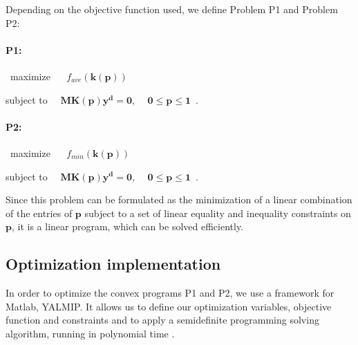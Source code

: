 
        \noindent Depending on the objective function used, we define Problem P1 and Problem P2:

        \paragraph{P1:} ~maximize ~~ $f_{ave}(\mathbf{k(p)})$

        \vspace{1.5mm}

        \hspace{4.5mm} subject to ~~$\mathbf{M}\mathbf{K(p)}\mathbf{y^d} =
        \mathbf{0}$, ~~$\mathbf{0} \leq \mathbf{p} \leq \mathbf{1}$~.
        \vspace{2mm}


        \paragraph{P2:} ~maximize ~~ $f_{min}(\mathbf{k(p)})$

        \vspace{1.5mm}

        \hspace{4.5mm} subject to ~~$\mathbf{M}\mathbf{K(p)}\mathbf{y^d} =
        \mathbf{0}$, ~~$\mathbf{0} \leq \mathbf{p} \leq \mathbf{1}$~.
        \vspace{2mm}


        Since this problem can be formulated as the minimization of a linear
        combination of the entries of $\mathbf{p}$ subject to a set of
        linear equality and inequality constraints on $\mathbf{p}$, it is a
        linear program, which can be solved efficiently.



    \subsection{Optimization implementation} %
    \label{sub:optimization_implementation}
        In order to optimize the convex programs P1 and P2, we use a framework for Matlab, YALMIP\cite{Lofberg:2004p11461}. It allows us to define our optimization variables, objective function and constraints and to apply a semidefinite programming solving algorithm, running in polynomial time \cite{Lofberg:2004p11461}.



